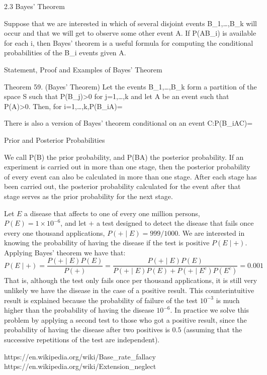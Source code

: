 2.3 Bayes' Theorem

Suppose that we are interested in which of several disjoint events B_{1},\ldots,B_{k} will occur and that we will get to observe some other event A. If P\left(A\mid B_{i}\right) is available for each i, then Bayes' theorem is a useful formula for computing the conditional probabilities of the B_{i} events given A.

Statement, Proof and Examples of Bayes' Theorem

Theorem 59. (Bayes' Theorem) Let the events B_{1},\ldots,B_{k} form a partition of the space S such that P\left(B_{j}\right)>0 for j=1,\ldots,k and let A be an event such that P\left(A\right)>0. Then, for i=1,\ldots,k,P\left(B_{i}\mid A\right)=

There is also a version of Bayes' theorem conditional on an event C:P\left(B_{i}\mid A\cap C\right)=

Prior and Posterior Probabilities

We call P\left(B\right) the prior probability, and P\left(B\mid A\right) the posterior probability. If an experiment is carried out in more than one stage, then the posterior probability of every event can also be calculated in more than one stage. After each stage has been carried out, the posterior probability calculated for the event after that stage serves as the prior probability for the next stage.

\begin{example}
Let $E$ a disease that affects to one of every one million persons, $P(E) = 1 \times 10^{-6}$, and let $+$ a test designed to detect the disease that fails once every one thousand applications, $P(+ \mid E) = 999/1000$. We are interested in knowing the probability of having the disease if the test is positive $P(E \mid +)$. Applying Bayes' theorem we have that:
\[
P(E \mid +) = \frac{P(+ \mid E) P(E)}{P(+)} = \frac{P(+ \mid E) P(E)}{P(+ \mid E) P(E) + P(+ \mid E^c) P(E^c)} = 0.001
\]
That is, although the test only fails once per thousand applications, it is still very unlikely we have the disease in the case of a positive result. This counterintuitive result is explained because the probability of failure of the test $10^{-3}$ is much higher than the probability of having the disease $10^{-6}$. In practice we solve this problem by applying a second test to those who got a positive result, since the probability of having the disease after two positives is $0.5$ (assuming that the successive repetitions of the test are independent).

https://en.wikipedia.org/wiki/Base_rate_fallacy
https://en.wikipedia.org/wiki/Extension_neglect

\end{example}




